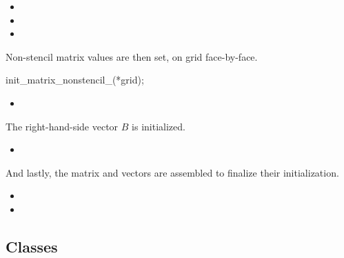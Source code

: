 \documentclass[10pt]{article}
\begin{document}
\begin{itemize}
\item {}
\item {}
\item {}
\end{itemize}

Non-stencil matrix values are then set, on grid face-by-face.

      init\_matrix\_nonstencil\_(*grid);

\begin{itemize}
\item {}
\end{itemize}

The right-hand-side vector $B$ is initialized.

\begin{itemize}
\item {}
\end{itemize}

And lastly, the matrix and vectors are assembled to finalize their
initialization.

\begin{itemize}
\item {}
\item {}
\end{itemize}


\subsubsection{}

\subsubsection{}

\subsection{Classes} \label{ss:classes}
\end{document}
